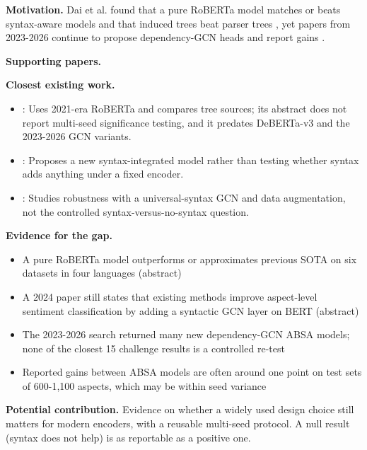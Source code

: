 \documentclass[11pt,a4paper]{article}
\begin{document}
\textbf{Motivation.} Dai et al. found that a pure RoBERTa model matches or beats syntax-aware models and that induced trees beat parser trees \cite{dai2021syntax}, yet papers from 2023-2026 continue to propose dependency-GCN heads and report gains \cite{zhao2023rdgcn,huang2025mvasegcn,li2024sebert}.

\textbf{Supporting papers.} \cite{dai2021syntax,li2024sebert,zhao2023rdgcn,huang2025mvasegcn}

\textbf{Closest existing work.}
\begin{itemize}
\item \cite{dai2021syntax}: Uses 2021-era RoBERTa and compares tree sources; its abstract does not report multi-seed significance testing, and it predates DeBERTa-v3 and the 2023-2026 GCN variants.
\item \cite{li2024sebert}: Proposes a new syntax-integrated model rather than testing whether syntax adds anything under a fixed encoder.
\item \cite{fei2022absarobust}: Studies robustness with a universal-syntax GCN and data augmentation, not the controlled syntax-versus-no-syntax question.
\end{itemize}

\textbf{Evidence for the gap.}
\begin{itemize}
\item [V] A pure RoBERTa model outperforms or approximates previous SOTA on six datasets in four languages (abstract) \cite{dai2021syntax}
\item [V] A 2024 paper still states that existing methods improve aspect-level sentiment classification by adding a syntactic GCN layer on BERT (abstract) \cite{li2024sebert}
\item [V] The 2023-2026 search returned many new dependency-GCN ABSA models; none of the closest 15 challenge results is a controlled re-test \cite{zhao2023rdgcn,huang2025mvasegcn}
\item [S] Reported gains between ABSA models are often around one point on test sets of 600-1,100 aspects, which may be within seed variance
\end{itemize}

\textbf{Potential contribution.} Evidence on whether a widely used design choice still matters for modern encoders, with a reusable multi-seed protocol. A null result (syntax does not help) is as reportable as a positive one.
\end{document}
